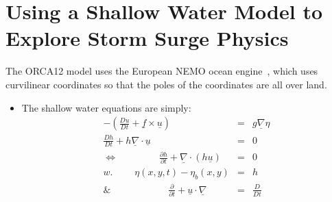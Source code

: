 %

\section{Using a Shallow Water Model to Explore Storm Surge Physics}
\label{sec:2_Water_Model}

The ORCA12 model uses the European NEMO ocean engine~\cite{madec2015nemo}, which
uses curvilinear coordinates so that the poles of the coordinates are all over land.


\begin{itemize}
    \item The shallow water equations are simply:
    \begin{eqnarray}
     -\left(\frac{Du}{Dt} + \underline{f}\times\underline{u} \right) &=& g \underline{\nabla} \eta  \\
 \frac{Dh}{Dt} + h \underline{\nabla}\cdot\underline{u} &=& 0\\
\Leftrightarrow  \;\quad\quad\quad\quad \frac{\partial h}{\partial t} + \underline{\nabla}\cdot (h\underline{u})&=& 0 \\
w. \;\quad\quad \eta(x, y, t) - \eta_{b}(x, y)  &=& h \\
\& \quad\quad\quad\quad\quad\quad \frac{\partial}{\partial t} + \underline{u}\cdot\underline{\nabla}   &=& \frac{D}{Dt}
    \end{eqnarray}
\end{itemize}


%

